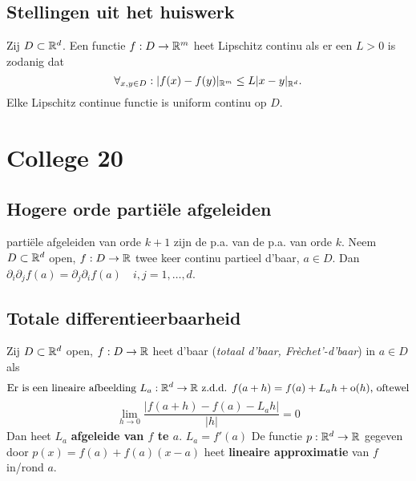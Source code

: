 \documentclass{2wa40summary}
\begin{document}
\begin{gevolg}
\end{gevolg}



        \subsection{Stellingen uit het huiswerk}
			\theorem Zij $D \subset \mathbb{R}^d$. Een functie $f:D \rightarrow \mathbb{R}^m$ heet Lipschitz continu als er een $L>0$ is zodanig dat
            \[\forall _{x,y \in D}: |f(x)-f(y)|_{\mathbb{R}^m} \leq L|x-y|_{\mathbb{R}^d}.\]
            Elke Lipschitz continue functie is uniform continu op $D$.
    \newpage
    \section{College 20}
        \subsection{Hogere orde parti\"ele afgeleiden}
             parti\"ele afgeleiden van orde $k+1$ zijn de p.a. van de p.a. van orde $k$.
             Neem $D \subset \mathbb{R}^d$ open, $f:D \rightarrow \mathbb{R}$ twee keer continu partieel d'baar, $a \in D$. Dan $\partial_i \partial_j f(a) = \partial_j \partial_i f(a) \quad i,j=1,\dots ,d$.
        \subsection{Totale differentieerbaarheid}
             Zij $D \subset \mathbb{R}^d$ open, $f:D \rightarrow \mathbb{R}$ heet d'baar (\textit{totaal d'baar, Fr\`echet'-d'baar}) in $a \in D$ als
            \[\text{Er is een lineaire afbeelding } L_a:\mathbb{R}^d \rightarrow \mathbb{R} \text{ z.d.d. } f(a+h)=f(a)+L_a h +\mathrm{o}(h)\text{, oftewel}\]
            \[\lim_{h \rightarrow 0}\frac{|f(a+h)-f(a)-L_a h|}{|h|} = 0\]
            Dan heet $L_a$ \textbf{afgeleide van $f$ te $a$}.
            \nota $L_a = f'(a)$
             De functie $ p: \mathbb{R}^d \rightarrow \mathbb{R} $ gegeven door $ p(x)=f(a)+f(a)(x-a) $ heet \textbf{lineaire approximatie} van $ f $ in/rond $ a $.
\end{document}
